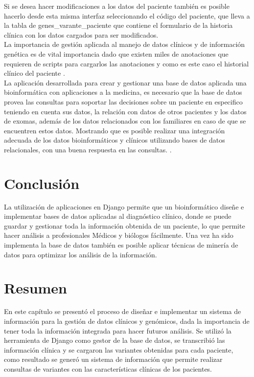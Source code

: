 Si se desea hacer modificaciones a los datos del paciente también es posible hacerlo desde esta misma interfaz seleccionando el código del paciente, que lleva a la tabla de genes\_varante\_paciente que contiene el formulario de la historia clínica con los datos cargados para ser modificados. \\

La importancia de gestión aplicada al manejo de datos clínicos y de información genética es de vital importancia dado que existen miles de anotaciones que requieren de scripts para cargarlos las anotaciones y como es este caso el historial clínico del paciente \cite{Paila2013}.\\

La aplicación desarrollada para crear y gestionar una base de datos aplicada una bioinformática con aplicaciones a la medicina, es necesario que la base de datos provea las consultas para soportar las decisiones sobre un paciente en especifico teniendo en cuenta sus datos, la relación con datos de otros pacientes y los datos de exomas, además de los datos relacionados con los familiares en caso de que se encuentren estos datos. Mostrando que es posible realizar una integración adecuada de los datos bioinformáticos y clínicos utilizando bases de datos relacionales, con una buena respuesta en las consultas. \cite{Sujansky2001}. 

\section{Conclusión}

La utilización de aplicaciones en Django permite que un bioinformático diseñe e implementar bases de datos aplicadas al diagnóstico clínico, donde se puede guardar y gestionar toda la información obtenida de un paciente, lo que permite hacer análisis a profesionales Médicos y biólogos fácilmente. Una vez ha sido implementa la base de datos también es posible aplicar técnicas de minería de datos para optimizar los análisis de la información. \\

\section*{Resumen}

En este capítulo se presentó el proceso de diseñar e implementar un sistema de información para la gestión de datos clínicos y genómicos, dada la importancia de tener toda la información integrada para hacer futuros análisis. Se utilizó la herramienta de Django como gestor de la base de datos, se transcribió las información clínica y se cargaron las variantes obtenidas para cada paciente, como resultado se generó un sistema de información que permite realizar consultas de variantes con las características clínicas de los pacientes.   